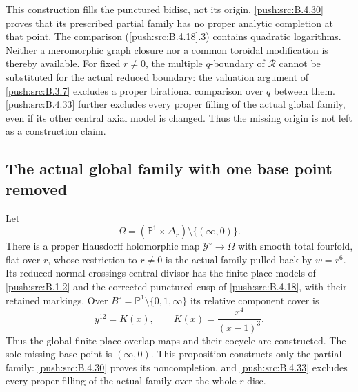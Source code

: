 \begin{remark}
This construction fills the punctured bidisc, not its
origin. \ref{push:src:B.4.30} proves that its prescribed partial family
has no proper analytic completion at that point.
The comparison (\ref{push:src:B.4.18}.3) contains quadratic
logarithms. Neither a meromorphic graph closure
nor a common toroidal modification is thereby
available. For fixed $r\ne0$, the multiple
$q$-boundary of $\mathcal R$ cannot be substituted
for the actual reduced boundary: the valuation
argument of \ref{push:src:B.3.7} excludes a proper birational
comparison over $q$ between them. \ref{push:src:B.4.33} further
excludes every proper filling of the actual global family,
even if its other central axial model is changed. Thus
the missing origin is not left as a construction claim.
\end{remark}


\subsection{The actual global family with one base point removed}

\begin{proposition}\label{push:src:B.4.19}
\label{push:B419}
Let
\[
 \Omega=(\mathbb P^1\times\Delta_r)
                  \setminus\{(\infty,0)\}.
\]
There is a proper Hausdorff holomorphic map
$\mathcal Y^\circ\to\Omega$ with smooth total fourfold,
flat over $r$, whose restriction to $r\ne0$ is the
actual family pulled back by $w=r^6$. Its reduced
normal-crossings central divisor has the finite-place
models of \ref{push:src:B.1.2} and the corrected punctured cusp of
\ref{push:src:B.4.18}, with their retained markings. Over
$B^\circ=\mathbb P^1\setminus\{0,1,\infty\}$ its
relative component cover is
\[
 y^{12}=K(x),\qquad K(x)=\frac{x^4}{(x-1)^3}.
\]
Thus the global finite-place overlap maps and their
cocycle are constructed. The sole missing base point
is $(\infty,0)$. This proposition constructs only the
partial family: \ref{push:src:B.4.30} proves its noncompletion, and
\ref{push:src:B.4.33} excludes every proper filling of the actual
family over the whole $r$ disc.
\end{proposition}


